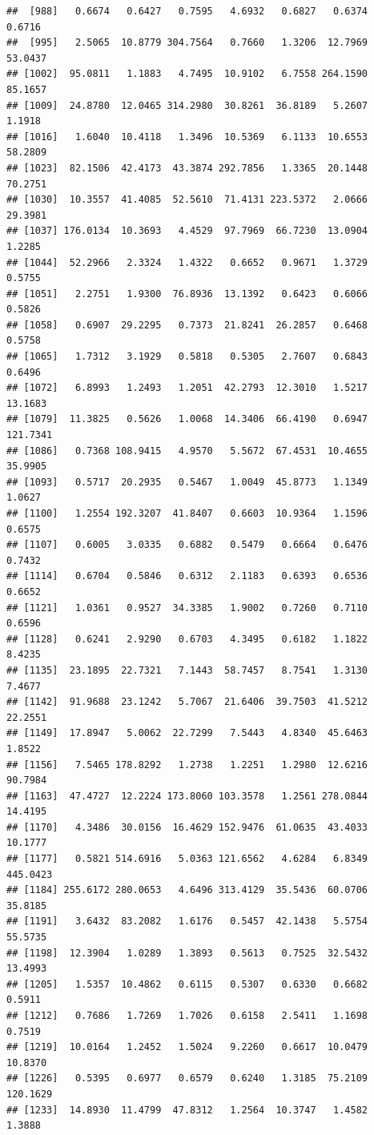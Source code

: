 \documentclass{article}\usepackage[]{graphicx}\usepackage[]{color}
\makeatletter
\newenvironment{kframe}{%
 \def\at@end@of@kframe{}%
 \ifinner\ifhmode%
  \def\at@end@of@kframe{\end{minipage}}%
  \begin{minipage}{\columnwidth}%
 \fi\fi%
 \def\FrameCommand##1{\hskip\@totalleftmargin \hskip-\fboxsep
 \colorbox{shadecolor}{##1}\hskip-\fboxsep
     \hskip-\linewidth \hskip-\@totalleftmargin \hskip\columnwidth}%
 \MakeFramed {\advance\hsize-\width
   \@totalleftmargin\z@ \linewidth\hsize
   \@setminipage}}%
 {\par\unskip\endMakeFramed%
 \at@end@of@kframe}
\newenvironment{knitrout}{}{} %
\makeatother
\begin{document}
\begin{knitrout}
\begin{kframe}
\begin{verbatim}
##  [988]   0.6674   0.6427   0.7595   4.6932   0.6827   0.6374   0.6716
##  [995]   2.5065  10.8779 304.7564   0.7660   1.3206  12.7969  53.0437
## [1002]  95.0811   1.1883   4.7495  10.9102   6.7558 264.1590  85.1657
## [1009]  24.8780  12.0465 314.2980  30.8261  36.8189   5.2607   1.1918
## [1016]   1.6040  10.4118   1.3496  10.5369   6.1133  10.6553  58.2809
## [1023]  82.1506  42.4173  43.3874 292.7856   1.3365  20.1448  70.2751
## [1030]  10.3557  41.4085  52.5610  71.4131 223.5372   2.0666  29.3981
## [1037] 176.0134  10.3693   4.4529  97.7969  66.7230  13.0904   1.2285
## [1044]  52.2966   2.3324   1.4322   0.6652   0.9671   1.3729   0.5755
## [1051]   2.2751   1.9300  76.8936  13.1392   0.6423   0.6066   0.5826
## [1058]   0.6907  29.2295   0.7373  21.8241  26.2857   0.6468   0.5758
## [1065]   1.7312   3.1929   0.5818   0.5305   2.7607   0.6843   0.6496
## [1072]   6.8993   1.2493   1.2051  42.2793  12.3010   1.5217  13.1683
## [1079]  11.3825   0.5626   1.0068  14.3406  66.4190   0.6947 121.7341
## [1086]   0.7368 108.9415   4.9570   5.5672  67.4531  10.4655  35.9905
## [1093]   0.5717  20.2935   0.5467   1.0049  45.8773   1.1349   1.0627
## [1100]   1.2554 192.3207  41.8407   0.6603  10.9364   1.1596   0.6575
## [1107]   0.6005   3.0335   0.6882   0.5479   0.6664   0.6476   0.7432
## [1114]   0.6704   0.5846   0.6312   2.1183   0.6393   0.6536   0.6652
## [1121]   1.0361   0.9527  34.3385   1.9002   0.7260   0.7110   0.6596
## [1128]   0.6241   2.9290   0.6703   4.3495   0.6182   1.1822   8.4235
## [1135]  23.1895  22.7321   7.1443  58.7457   8.7541   1.3130   7.4677
## [1142]  91.9688  23.1242   5.7067  21.6406  39.7503  41.5212  22.2551
## [1149]  17.8947   5.0062  22.7299   7.5443   4.8340  45.6463   1.8522
## [1156]   7.5465 178.8292   1.2738   1.2251   1.2980  12.6216  90.7984
## [1163]  47.4727  12.2224 173.8060 103.3578   1.2561 278.0844  14.4195
## [1170]   4.3486  30.0156  16.4629 152.9476  61.0635  43.4033  10.1777
## [1177]   0.5821 514.6916   5.0363 121.6562   4.6284   6.8349 445.0423
## [1184] 255.6172 280.0653   4.6496 313.4129  35.5436  60.0706  35.8185
## [1191]   3.6432  83.2082   1.6176   0.5457  42.1438   5.5754  55.5735
## [1198]  12.3904   1.0289   1.3893   0.5613   0.7525  32.5432  13.4993
## [1205]   1.5357  10.4862   0.6115   0.5307   0.6330   0.6682   0.5911
## [1212]   0.7686   1.7269   1.7026   0.6158   2.5411   1.1698   0.7519
## [1219]  10.0164   1.2452   1.5024   9.2260   0.6617  10.0479  10.8370
## [1226]   0.5395   0.6977   0.6579   0.6240   1.3185  75.2109 120.1629
## [1233]  14.8930  11.4799  47.8312   1.2564  10.3747   1.4582   1.3888

\end{verbatim}
\end{kframe}
\end{knitrout}
\end{document}
